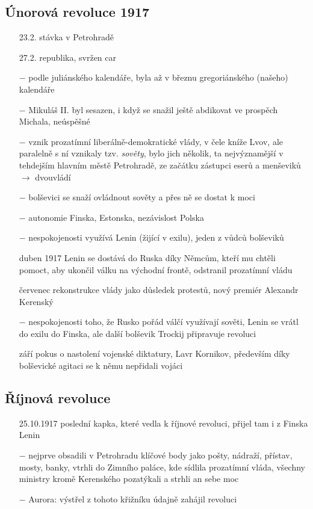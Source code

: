 \documentclass{article}
\begin{document}
\subsection*{Únorová revoluce 1917}
\begin{itemize}
    \vspace{-0.5em}
    \setlength\itemsep{0.15em}
    \item[23.2.] stávka v Petrohradě
    \item[27.2.] republika, svržen car
    \item[$-$] podle juliánského kalendáře, byla až v březnu gregoriánského (našeho) kalendáře
    \item[$-$] Mikuláš II. byl sesazen, i když se snažil ještě abdikovat ve prospěch Michala, neúspěšné
    \item[$-$] vznik prozatímní liberálně-demokratické vlády, v čele kníže Lvov, ale paralelně s ní vznikaly tzv. \textit{sověty}, bylo jich několik, ta nejvýznamější v tehdejším hlavním městě Petrohradě, ze začátku zástupci eserů a menševiků $\rightarrow$ dvouvládí
    \item[$-$] bolševici se snaží ovládnout sověty a přes ně se dostat k moci
    \item[$-$] autonomie Finska, Estonska, nezávislost Polska
    \item[$-$] nespokojenosti využívá Lenin (žijící v exilu), jeden z vůdců bolševiků
    \item[duben 1917] Lenin se dostává do Ruska díky Němcům, kteří mu chtěli pomoct, aby ukončil válku na východní frontě, odstranil prozatímní vládu
    \item[červenec] rekonstrukce vlády jako důsledek protestů, nový premiér Alexandr Kerenský
    \item[$-$] nespokojenosti toho, že Rusko pořád válčí využívají sověti, Lenin se vrátl do exilu do Finska, ale další bolševik Trockij připravuje revoluci
    \item[září] pokus o nastolení vojenské diktatury, Lavr Kornikov, především díky bolševické agitaci se k němu nepřidali vojáci
\end{itemize}

\subsection*{Říjnová revoluce}
\begin{itemize}
    \vspace{-0.5em}
    \setlength\itemsep{0.15em}
    \item[25.10.1917] poslední kapka, které vedla k říjnové revoluci, přijel tam i z Finska Lenin
    \item[$-$] nejprve obsadili v Petrohradu klíčové body jako pošty, nádraží, přístav, mosty, banky, vtrhli do Zimního paláce, kde sídlila prozatímní vláda, všechny ministry kromě Kerenského pozatýkali a strhli an sebe moc
    \item[$-$] Aurora: výstřel z tohoto křižníku údajně zahájil revoluci
\end{itemize}
\end{document}

